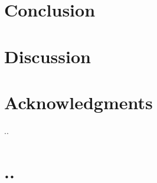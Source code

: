 \documentclass[fleqn,usenatbib]{mnras}
\begin{document}
\section{Conclusion}


\section{Discussion}


\section*{Acknowledgments}
..




\appendix

\section{..}
\end{document}
